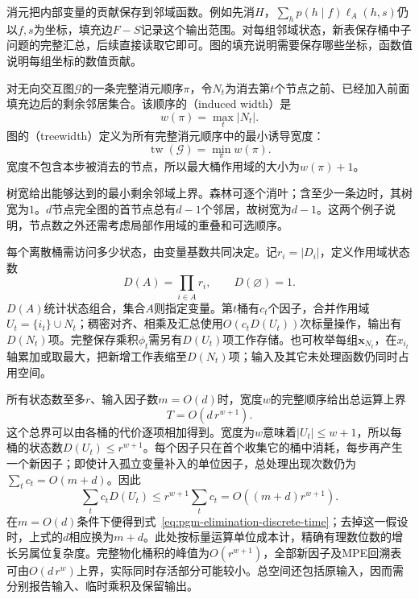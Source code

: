 消元把内部变量的贡献保存到邻域函数。例如先消$H$，$\sum_h p(h\mid f)\ell_A(h,s)$仍以$f,s$为坐标，填充边$F-S$记录这个输出范围。对每组邻域状态，新表保存桶中子问题的完整汇总，后续直接读取它即可。图的填充说明需要保存哪些坐标，函数值说明每组坐标的数值贡献。

\begin{definition}[诱导宽度与树宽]
  \label{def:pgm-elimination-treewidth}
  对无向交互图$\mathcal{G}$的一条完整消元顺序$\pi$，令$N_t$为消去第$t$个节点之前、已经加入前面填充边后的剩余邻居集合。该顺序的（induced width）是
  \[
    w(\pi)=\max_t|N_t|.
  \]
  图的（treewidth）定义为所有完整消元顺序中的最小诱导宽度：
  \[
    \operatorname{tw}(\mathcal{G})=\min_\pi w(\pi).
  \]
  宽度不包含本步被消去的节点，所以最大桶作用域的大小为$w(\pi)+1$。
\end{definition}

树宽给出能够达到的最小剩余邻域上界。森林可逐个消叶；含至少一条边时，其树宽为$1$。$d$节点完全图的首节点总有$d-1$个邻居，故树宽为$d-1$。这两个例子说明，节点数之外还需考虑局部作用域的重叠和可选顺序。

每个离散桶需访问多少状态，由变量基数共同决定。记$r_i=|D_i|$，定义作用域状态数
\[
  D(A)=\prod_{i\in A}r_i,\qquad D(\varnothing)=1.
\]
$D(A)$统计状态组合，集合$A$则指定变量。第$t$桶有$c_t$个因子，合并作用域$U_t=\{i_t\}\cup N_t$；稠密对齐、相乘及汇总使用$O(c_tD(U_t))$次标量操作，输出有$D(N_t)$项。完整保存乘积$\phi_t$需另有$D(U_t)$项工作存储。也可枚举每组$\bm{x}_{N_t}$，在$x_{i_t}$轴累加或取最大，把新增工作表缩至$D(N_t)$项；输入及其它未处理函数仍同时占用空间。

所有状态数至多$r$、输入因子数$m=O(d)$时，宽度$w$的完整顺序给出总运算上界
\begin{equation}
  T=O(d\,r^{w+1}).
  \label{eq:pgm-elimination-discrete-time}
\end{equation}
这个总界可以由各桶的代价逐项相加得到。宽度为$w$意味着$|U_t|\leq w+1$，所以每桶的状态数$D(U_t)\leq r^{w+1}$。每个因子只在首个收集它的桶中消耗，每步再产生一个新因子；即使计入孤立变量补入的单位因子，总处理出现次数仍为$\sum_t c_t=O(m+d)$。因此
\[
  \sum_t c_tD(U_t)
  \leq r^{w+1}\sum_t c_t
  =O((m+d)r^{w+1}).
\]
在$m=O(d)$条件下便得到式~\eqref{eq:pgm-elimination-discrete-time}；去掉这一假设时，上式的$d$相应换为$m+d$。此处按标量运算单位成本计，精确有理数位数的增长另属位复杂度。完整物化桶积的峰值为$O(r^{w+1})$，全部新因子及MPE回溯表可由$O(d\,r^w)$上界，实际同时存活部分可能较小。总空间还包括原输入，因而需分别报告输入、临时乘积及保留输出。

